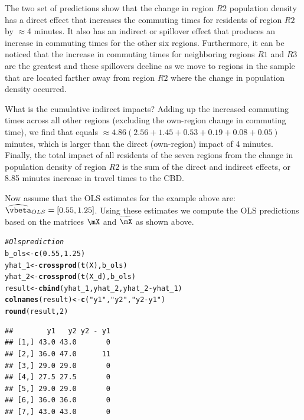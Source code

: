 \documentclass[english,12pt]{book}\usepackage[]{graphicx}\usepackage[]{xcolor}
\makeatletter
\newcommand{\hlnum}[1]{\textcolor[rgb]{0.686,0.059,0.569}{#1}}%
\newcommand{\hlsng}[1]{\textcolor[rgb]{0.192,0.494,0.8}{#1}}%
\newcommand{\hlcom}[1]{\textcolor[rgb]{0.678,0.584,0.686}{\textit{#1}}}%
\newcommand{\hlopt}[1]{\textcolor[rgb]{0,0,0}{#1}}%
\newcommand{\hldef}[1]{\textcolor[rgb]{0.345,0.345,0.345}{#1}}%
\newcommand{\hlkwb}[1]{\textcolor[rgb]{0.69,0.353,0.396}{#1}}%
\newcommand{\hlkwd}[1]{\textcolor[rgb]{0.737,0.353,0.396}{\textbf{#1}}}%
\newenvironment{kframe}{%
 \def\at@end@of@kframe{}%
 \ifinner\ifhmode%
  \def\at@end@of@kframe{\end{minipage}}%
  \begin{minipage}{\columnwidth}%
 \fi\fi%
 \def\FrameCommand##1{\hskip\@totalleftmargin \hskip-\fboxsep
 \colorbox{shadecolor}{##1}\hskip-\fboxsep
     \hskip-\linewidth \hskip-\@totalleftmargin \hskip\columnwidth}%
 \MakeFramed {\advance\hsize-\width
   \@totalleftmargin\z@ \linewidth\hsize
   \@setminipage}}%
 {\par\unskip\endMakeFramed%
 \at@end@of@kframe}
\newenvironment{knitrout}{}{} %
\makeatother
\begin{document}
The two set of predictions show that the change in region $R2$ population density has a direct effect that increases the commuting times for residents of region $R2$ by $\approx$4 minutes. It also has an indirect or spillover effect that produces an increase in commuting times for the other six regions. Furthermore, it can be noticed that the increase in commuting times for neighboring regions $R1$ and $R3$ are the greatest and these spillovers decline as we move to regions in the sample that are located farther away from region $R2$ where the change in population density occurred. 

What is the cumulative indirect impacts? Adding up the increased commuting times across all other regions (excluding the own-region change in commuting time), we find that equals $\approx  4.86 (2.56 + 1.45 + 0.53 + 0.19 + 0.08 + 0.05)$ minutes, which is larger than the direct (own-region) impact of 4 minutes. Finally, the total impact of all residents of the seven regions from the change in population density of region $R2$ is the sum of the direct and indirect effects, or 8.85 minutes increase in travel times to the CBD. 

Now assume that the OLS estimates for the example above are: $\widehat{\vbeta}_{OLS} = \left[0.55, 1.25\right]$. Using these estimates we compute the OLS predictions based on the matrices $\mX$ and $\widetilde{\mX}$ as shown above.

\begin{knitrout}
\color{fgcolor}\begin{kframe}
\begin{alltt}
\hlcom{# Ols prediction}
\hldef{b_ols} \hlkwb{<-} \hlkwd{c}\hldef{(}\hlnum{0.55}\hldef{,} \hlnum{1.25}\hldef{)}
\hldef{yhat_1} \hlkwb{<-} \hlkwd{crossprod}\hldef{(}\hlkwd{t}\hldef{(X), b_ols)}
\hldef{yhat_2} \hlkwb{<-} \hlkwd{crossprod}\hldef{(}\hlkwd{t}\hldef{(X_d), b_ols)}
\hldef{result} \hlkwb{<-} \hlkwd{cbind}\hldef{(yhat_1, yhat_2, yhat_2} \hlopt{-} \hldef{yhat_1)}
\hlkwd{colnames}\hldef{(result)} \hlkwb{<-} \hlkwd{c}\hldef{(}\hlsng{"y1"}\hldef{,} \hlsng{"y2"}\hldef{,} \hlsng{"y2 - y1"}\hldef{)}
\hlkwd{round}\hldef{(result,} \hlnum{2}\hldef{)}
\end{alltt}
\begin{verbatim}
##        y1   y2 y2 - y1
## [1,] 43.0 43.0       0
## [2,] 36.0 47.0      11
## [3,] 29.0 29.0       0
## [4,] 27.5 27.5       0
## [5,] 29.0 29.0       0
## [6,] 36.0 36.0       0
## [7,] 43.0 43.0       0
\end{verbatim}
\end{kframe}
\end{knitrout}
\end{document}
